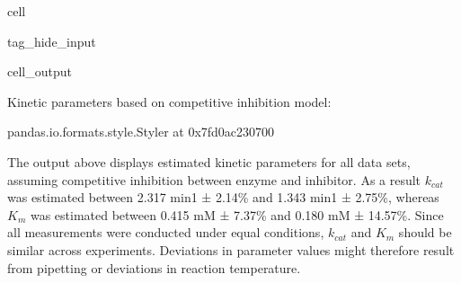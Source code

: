 \documentclass[letterpaper,12pt,english]{jupyterBook}
\begin{document}
\begin{sphinxuseclass}{cell}
\begin{sphinxuseclass}{tag_hide_input}
\begin{sphinxVerbatimOutput}
\begin{sphinxuseclass}{cell_output}
\begin{sphinxVerbatim}[commandchars=\\\{\}]
Kinetic parameters based on competitive inhibition model:
\end{sphinxVerbatim}

\begin{sphinxVerbatim}[commandchars=\\\{\}]
\PYGZlt{}pandas.io.formats.style.Styler at 0x7fd0ac230700\PYGZgt{}
\end{sphinxVerbatim}

\end{sphinxuseclass}\end{sphinxVerbatimOutput}

\end{sphinxuseclass}
\end{sphinxuseclass}
\sphinxAtStartPar
The output above displays estimated kinetic parameters for all data sets, assuming competitive inhibition between enzyme and inhibitor. As a result \(k_{cat}\) was estimated between 2.317 min\sphinxhyphen{}1 ± 2.14\% and 1.343 min\sphinxhyphen{}1 ± 2.75\%, whereas \(K_{m}\) was estimated between 0.415 mM ± 7.37\% and 0.180 mM ± 14.57\%.
Since all measurements were conducted under equal conditions, \(k_{cat}\) and \(K_{m}\) should be similar across experiments. Deviations in parameter values might therefore result from pipetting or deviations in reaction temperature.
\end{document}
